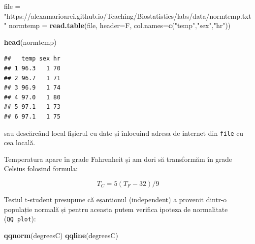 \documentclass[]{article}
\newenvironment{Shaded}{\begin{snugshade}}{\end{snugshade}}
\newcommand{\KeywordTok}[1]{\textcolor[rgb]{0.13,0.29,0.53}{\textbf{{#1}}}}
\newcommand{\DataTypeTok}[1]{\textcolor[rgb]{0.13,0.29,0.53}{{#1}}}
\newcommand{\DecValTok}[1]{\textcolor[rgb]{0.00,0.00,0.81}{{#1}}}
\newcommand{\StringTok}[1]{\textcolor[rgb]{0.31,0.60,0.02}{{#1}}}
\newcommand{\NormalTok}[1]{{#1}}
\begin{document}
\begin{Shaded}
\begin{Highlighting}[]
\NormalTok{file =}\StringTok{ "https://alexamarioarei.github.io/Teaching/Biostatistics/labs/data/normtemp.txt"}
\NormalTok{normtemp =}\StringTok{ }\KeywordTok{read.table}\NormalTok{(file, }\DataTypeTok{header=}\NormalTok{F, }\DataTypeTok{col.names=}\KeywordTok{c}\NormalTok{(}\StringTok{"temp"}\NormalTok{,}\StringTok{"sex"}\NormalTok{,}\StringTok{"hr"}\NormalTok{))}

\KeywordTok{head}\NormalTok{(normtemp)}
\end{Highlighting}
\end{Shaded}

\begin{verbatim}
##   temp sex hr
## 1 96.3   1 70
## 2 96.7   1 71
## 3 96.9   1 74
## 4 97.0   1 80
## 5 97.1   1 73
## 6 97.1   1 75
\end{verbatim}

sau descărcând local fișierul cu date și înlocuind adresa de internet
din \texttt{file} cu cea locală.

Temperatura apare în grade Fahrenheit și am dori să transformăm în grade
Celsius folosind formula:

\[
  T_C = 5(T_F-32)/9
\]

\begin{Shaded}
\end{Shaded}

Testul t-student presupune că eșantionul (independent) a provenit
dintr-o populație normală și pentru aceasta putem verifica ipoteza de
normalitate (\texttt{QQ\ plot}):

\begin{Shaded}
\begin{Highlighting}[]
\KeywordTok{qqnorm}\NormalTok{(degreesC)}
\KeywordTok{qqline}\NormalTok{(degreesC)}
\end{Highlighting}
\end{Shaded}
\end{document}
